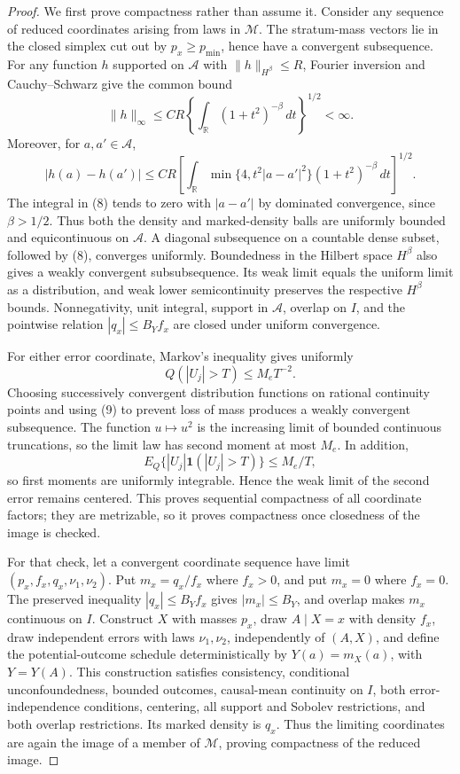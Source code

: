 \documentclass{article}
\begin{document}
\begin{proof}
We first prove compactness rather than assume it.  Consider any sequence of reduced coordinates arising from laws in \(\mathcal M\).  The stratum-mass vectors lie in the closed simplex cut out by \(p_x\ge p_{\min}\), hence have a convergent subsequence.  For any function \(h\) supported on \(\mathcal A\) with \(\|h\|_{H^\beta}\le R\), Fourier inversion and Cauchy--Schwarz give the common bound
\[
\|h\|_\infty
\le C R\left\{\int_{\mathbb R}(1+t^2)^{-\beta}\,dt\right\}^{1/2}<\infty. \tag{7}
\]
Moreover, for \(a,a'\in\mathcal A\),
\[
|h(a)-h(a')|
\le CR\left[\int_{\mathbb R}
\min\{4,t^2|a-a'|^2\}(1+t^2)^{-\beta}\,dt\right]^{1/2}. \tag{8}
\]
The integral in (8) tends to zero with \(|a-a'|\) by dominated convergence, since \(\beta>1/2\).  Thus both the density and marked-density balls are uniformly bounded and equicontinuous on \(\mathcal A\).  A diagonal subsequence on a countable dense subset, followed by (8), converges uniformly.  Boundedness in the Hilbert space \(H^\beta\) also gives a weakly convergent subsubsequence.  Its weak limit equals the uniform limit as a distribution, and weak lower semicontinuity preserves the respective \(H^\beta\) bounds.  Nonnegativity, unit integral, support in \(\mathcal A\), overlap on \(I\), and the pointwise relation \(|q_x|\le B_Yf_x\) are closed under uniform convergence.

For either error coordinate, Markov's inequality gives uniformly
\[
Q(|U_j|>T)\le M_eT^{-2}. \tag{9}
\]
Choosing successively convergent distribution functions on rational continuity points and using (9) to prevent loss of mass produces a weakly convergent subsequence.  The function \(u\mapsto u^2\) is the increasing limit of bounded continuous truncations, so the limit law has second moment at most \(M_e\).  In addition,
\[
E_Q\{|U_j|\mathbf 1(|U_j|>T)\}\le M_e/T, \tag{10}
\]
so first moments are uniformly integrable.  Hence the weak limit of the second error remains centered.  This proves sequential compactness of all coordinate factors; they are metrizable, so it proves compactness once closedness of the image is checked.

For that check, let a convergent coordinate sequence have limit \((p_x,f_x,q_x,\nu_1,\nu_2)\).  Put \(m_x=q_x/f_x\) where \(f_x>0\), and put \(m_x=0\) where \(f_x=0\).  The preserved inequality \(|q_x|\le B_Yf_x\) gives \(|m_x|\le B_Y\), and overlap makes \(m_x\) continuous on \(I\).  Construct \(X\) with masses \(p_x\), draw \(A\mid X=x\) with density \(f_x\), draw independent errors with laws \(\nu_1,\nu_2\), independently of \((A,X)\), and define the potential-outcome schedule deterministically by \(Y(a)=m_X(a)\), with \(Y=Y(A)\).  This construction satisfies consistency, conditional unconfoundedness, bounded outcomes, causal-mean continuity on \(I\), both error-independence conditions, centering, all support and Sobolev restrictions, and both overlap restrictions.  Its marked density is \(q_x\).  Thus the limiting coordinates are again the image of a member of \(\mathcal M\), proving compactness of the reduced image.


\end{proof}
\end{document}
